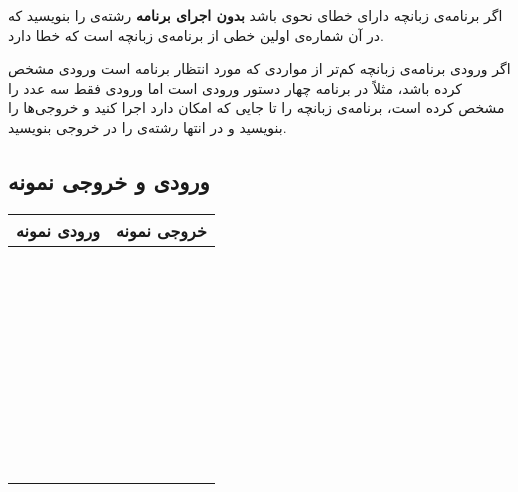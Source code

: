 \documentclass{utsignal}
\begin{document}
    اگر برنامه‌ی زبانچه دارای خطای نحوی باشد \textbf{بدون اجرای برنامه} رشته‌ی  را بنویسید که در آن  شماره‌ی اولین خطی از برنامه‌ی زبانچه است که خطا دارد.

    اگر ورودی برنامه‌ی زبانچه کم‌تر از مواردی که مورد انتظار برنامه است ورودی مشخص کرده باشد، مثلاً در برنامه چهار دستور ورودی است اما ورودی فقط سه عدد را مشخص کرده است، برنامه‌ی زبانچه را تا جایی که امکان دارد اجرا کنید و خروجی‌ها را بنویسید و در انتها رشته‌ی  را در خروجی بنویسید.


    \subsection{ورودی و خروجی نمونه}
    \begin{table}[H]
        \centering
        \begin{tabular}{|c|c|}
            \hline
            ورودی نمونه & خروجی نمونه\\
            \hline
            \hline
            \begin{latin}\begin{minipage}[]{0.3\textwidth}\footnotesize
            \end{minipage}\end{latin}
            &
            \begin{latin}\begin{minipage}[]{0.3\textwidth}\footnotesize
            \begin{verbatim}







            \end{verbatim}
            \end{minipage}\end{latin}
            \\
            \hline
            \begin{latin}\begin{minipage}[]{0.3\textwidth}\footnotesize
            \end{minipage}\end{latin}
            &
            \begin{latin}\begin{minipage}[]{0.3\textwidth}\footnotesize
            \begin{verbatim}





\end{verbatim}
\end{minipage}
\end{latin}
\end{tabular}
\end{table}
\end{document}

